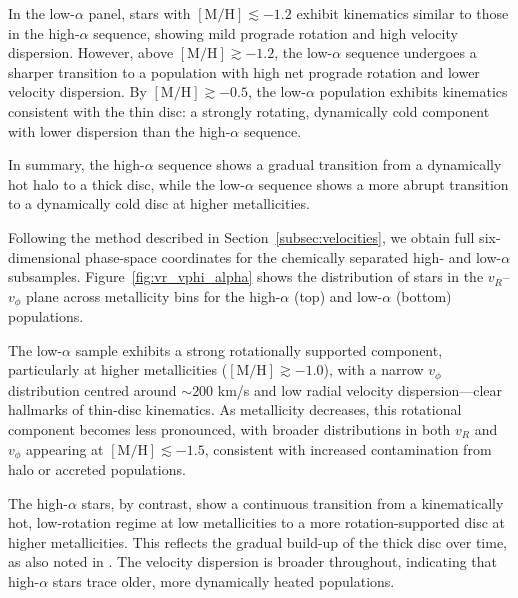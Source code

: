 \documentclass[a4paper,12pt]{article}
\begin{document}
In the low-$\alpha$ panel, stars with $[\mathrm{M/H}]\lesssim -1.2$ exhibit kinematics similar 
to those in the high-$\alpha$ sequence, showing mild prograde rotation and high velocity dispersion. 
However, above $[\mathrm{M/H}]\gtrsim -1.2$, the low-$\alpha$ sequence 
undergoes a sharper transition to a population with high net prograde rotation and lower velocity dispersion. 
By $[\mathrm{M/H}]\gtrsim -0.5$, the low-$\alpha$ population exhibits kinematics consistent with the thin disc: 
a strongly rotating, dynamically cold component with lower dispersion than the high-$\alpha$ sequence.


In summary, the high-$\alpha$ sequence shows a gradual transition from
a dynamically hot halo to a thick disc, while the low-$\alpha$ sequence
shows a more abrupt transition to a dynamically cold disc at higher metallicities.



Following the method described in Section~\ref{subsec:velocities}, we obtain full six-dimensional
phase-space coordinates for the chemically separated high- and low-$\alpha$ subsamples.
Figure~\ref{fig:vr_vphi_alpha} shows the distribution of stars in the $v_R$–$v_\phi$ plane
across metallicity bins for the high-$\alpha$ (top) and low-$\alpha$ (bottom) populations.

The low-$\alpha$ sample exhibits a strong rotationally supported component, particularly at
higher metallicities ($[\mathrm{M/H}] \gtrsim -1.0$), with a narrow $v_\phi$ distribution centred
around $\sim200$ km/s and low radial velocity dispersion—clear hallmarks of thin-disc kinematics.
As metallicity decreases, this rotational component becomes less pronounced, with broader
distributions in both $v_R$ and $v_\phi$ appearing at $[\mathrm{M/H}] \lesssim -1.5$, consistent
with increased contamination from halo or accreted populations.

The high-$\alpha$ stars, by contrast, show a continuous transition from a kinematically hot,
low-rotation regime at low metallicities to a more rotation-supported disc at higher
metallicities. This reflects the gradual build-up of the thick disc over time, as also noted in
\citet{Chandra_2024}. The velocity dispersion is broader throughout,
indicating that high-$\alpha$ stars trace older, more dynamically heated populations.
\end{document}
